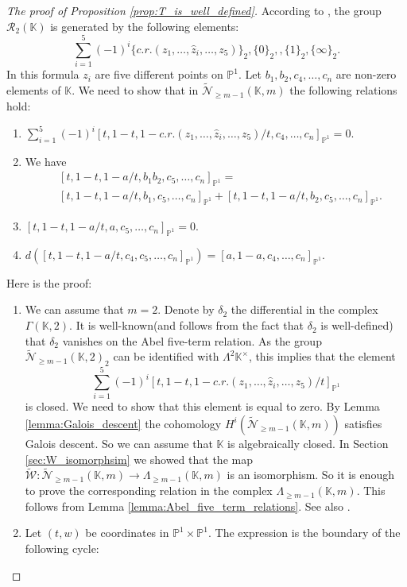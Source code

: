 \documentclass[12pt]{extarticle}
\def\mb{\mathbb}
\def\mc{\mathcal}
\def\L{\Lambda}
\def\k{\mb K}
\def\t{\times}
\def\wt{\widetilde}
\renewcommand{\P}{{\mb P}}
\def\W{\mc W}
\def \tW{\wt{\W}}
\def \wW{\tW}
\def \wL{\L_{\geq m-1}}
\def \CH{\mc{N}}
\def \wCH{\wt{\CH}_{\geq m-1}}
\def \G{\Gamma}
\begin{document}
\begin{proof}[The proof of Proposition \ref{prop:T_is_well_defined}]
    According to \cite{goncharov1994polylogarithms}, the group $\mc R_2(\k)$ is generated by the following elements:
    $$\sum\limits_{i=1}^5(-1)^i\{c.r.(z_1,\dots, \widehat z_i,\dots, z_5)\}_2, \{0\}_2,, \{1\}_2, \{\infty\}_2.$$
    In this formula $z_i$ are five different points on $\P^1$. Let $b_1,b_2,c_4,\dots, c_{n}$ are non-zero elements of $\k$. We need to show that in $\wCH(\k,m)$ the following relations hold:
    \begin{enumerate}
        \item $\sum\limits_{i=1}^5(-1)^i[t,1-t,1-c.r.(z_1,\dots, \hat z_i,\dots, z_5)/t, c_4,\dots, c_{n}]_{\P^1}=0.$
        \item We have
        \begin{align*}
            &[t,1-t,1-a/t, b_1b_2,c_5,\dots, c_{n}]_{\P^1}=\\&[t,1-t,1-a/t, b_1,c_5,\dots, c_{n}]_{\P^1}+[t,1-t,1-a/t,  b_2,c_5,\dots, c_{n}]_{\P^1}.
            \end{align*}
        \item $[t,1-t,1-a/t, a, c_5,\dots, c_{n}]_{\P^1}=0.$
        \item $d([t,1-t,1-a/t, c_4, c_5,\dots, c_{n}]_{\P^1})=[a,1-a,c_4,\dots, c_{n}]_{\P^1}.$
    \end{enumerate}
    Here is the proof:
    \begin{enumerate}
        \item We can assume that $m=2$. Denote by $\delta_2$ the differential in the complex $\G(\k,2)$. It is well-known(and follows from the fact that $\delta_2$ is well-defined) that $\delta_2$ vanishes on the Abel five-term relation. As the group $\wCH(\k,2)_2$ can be identified with $\L^2\k^\t$, this implies that the element
        $$\sum\limits_{i=1}^5(-1)^i[t,1-t,1-c.r.(z_1,\dots, \hat z_i,\dots, z_5)/t]_{\P^1}$$
        is closed.
        We need to show that this element is equal to zero. By Lemma \ref{lemma:Galois_descent} the cohomology $H^i(\wCH(\k,m))$ satisfies Galois descent. So we can assume that $\k$ is algebraically closed. In Section \ref{sec:W_isomorphsim} we showed that the map $\wW\colon \wCH(\k,m)\to\wL(\k,m)$ is an isomorphism. So it is enough to prove the corresponding relation in the complex $\wL(\k,m)$. This follows from Lemma \ref{lemma:Abel_five_term_relations}. See also \cite{cubical1999herbert}.
        \item Let $(t,w)$ be coordinates in $\P^1\t\P^1$. The expression is the boundary of the following cycle:

\end{enumerate}
\end{proof}
\end{document}
